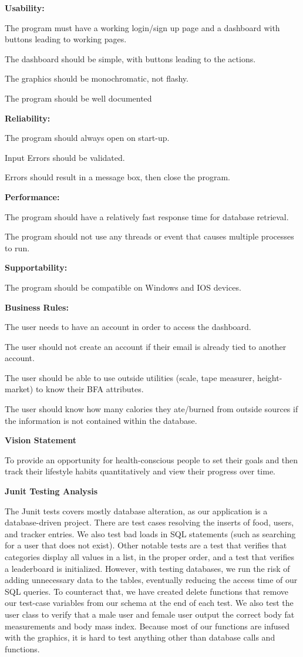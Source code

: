 \documentclass[10pt]{article}
\begin{document}
\textbf{Usability:}

The program must have a working login/sign up page and a dashboard with
buttons leading to working pages.

The dashboard should be simple, with buttons leading to the actions.

The graphics should be monochromatic, not flashy.

The program should be well documented

\textbf{Reliability:}

The program should always open on start-up.

Input Errors should be validated.

Errors should result in a message box, then close the program.

\textbf{Performance:}

The program should have a relatively fast response time for database
retrieval.

The program should not use any threads or event that causes multiple
processes to run.

\textbf{Supportability:}

The program should be compatible on Windows and IOS devices.

\textbf{Business Rules:}

The user needs to have an account in order to access the dashboard.

The user should not create an account if their email is already tied to
another account.

The user should be able to use outside utilities (scale, tape measurer,
height-market) to know their BFA attributes.

The user should know how many calories they ate/burned from outside
sources if the information is not contained within the database.

\textbf{Vision Statement}

To provide an opportunity for health-conscious people to set their goals
and then track their lifestyle habits quantitatively and view their
progress over time.

\textbf{Junit Testing Analysis}

The Junit tests covers mostly database alteration, as our application is
a database-driven project. There are test cases resolving the inserts of
food, users, and tracker entries. We also test bad loads in SQL
statements (such as searching for a user that does not exist). Other
notable tests are a test that verifies that categories display all
values in a list, in the proper order, and a test that verifies a
leaderboard is initialized. However, with testing databases, we run the
risk of adding unnecessary data to the tables, eventually reducing the
access time of our SQL queries. To counteract that, we have created
delete functions that remove our test-case variables from our schema at
the end of each test. We also test the user class to verify that a male
user and female user output the correct body fat measurements and body
mass index. Because most of our functions are infused with the graphics,
it is hard to test anything other than database calls and functions.
\end{document}
